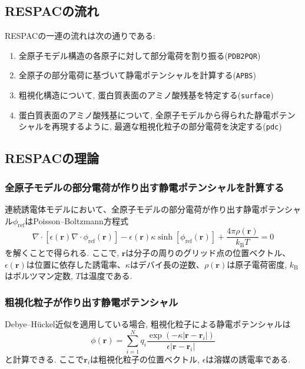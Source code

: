 \subsection{RESPACの流れ}
RESPACの一連の流れは次の通りである:
\begin{enumerate}
    \item 全原子モデル構造の各原子に対して部分電荷を割り振る(\texttt{PDB2PQR})
    \item 全原子の部分電荷に基づいて静電ポテンシャルを計算する(\texttt{APBS})
    \item 粗視化構造について, 蛋白質表面のアミノ酸残基を特定する(\texttt{surface})
    \item 蛋白質表面のアミノ酸残基について, 全原子モデルから得られた静電ポテンシャルを再現するように, 最適な粗視化粒子の部分電荷を決定する(\texttt{pdc})
\end{enumerate}

\subsection{RESPACの理論}
\subsubsection{全原子モデルの部分電荷が作り出す静電ポテンシャルを計算する}
連続誘電体モデルにおいて、全原子モデルの部分電荷が作り出す静電ポテンシャル$\phi_{\mathrm{ref}}$はPoisson–Boltzmann方程式
\begin{equation}
    \nabla \cdot
    \left[
        \epsilon(\bm{r}) \nabla \cdot \phi_{\mathrm{ref}}(\bm{r})
    \right]
    -
    \epsilon(\bm{r}) \kappa \sinh[\phi_{\mathrm{ref}}(\bm{r})]
    +
    \frac{4 \pi \rho(\bm{r})}{k_{\mathrm{B}}T}
    =
    0
\end{equation}
を解くことで得られる.
ここで, $\bm{r}$は分子の周りのグリッド点の位置ベクトル、$\epsilon(\bm{r})$は位置に依存した誘電率、$\kappa$はデバイ長の逆数、$\rho(\bm{r})$は原子電荷密度, $k_{\mathrm{B}}$はボルツマン定数,
$T$は温度である.

\subsubsection{粗視化粒子が作り出す静電ポテンシャル}
Debye--H\"{u}ckel近似を適用している場合, 粗視化粒子による静電ポテンシャルは
\begin{equation}
    \phi(\bm{r})
    =
    \sum_{i=1}^{N}
    q_{i}
    \frac{\exp(-\kappa |\bm{r} - \bm{r}_{i}|)}{\epsilon |\bm{r} - \bm{r}_{i}|}
\end{equation}
と計算できる.
ここで$\bm{r}_{i}$は粗視化粒子の位置ベクトル, $\epsilon$は溶媒の誘電率である.

